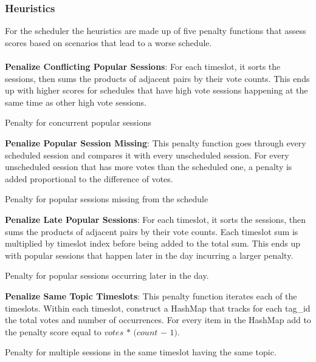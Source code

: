 \subsubsection{Heuristics}
For the scheduler the heuristics are made up of five penalty functions that assess scores based on scenarios that lead to a worse schedule. \\\\
%
%
\textbf{Penalize Conflicting Popular Sessions}: For each timeslot, it sorts the sessions, then sums the products of adjacent pairs by their vote counts. This ends up with higher scores for schedules that have high vote sessions happening at the same time as other high vote sessions.
\begin{pseudocode}{Penalty for concurrent popular sessions}
    
\end{pseudocode}

\textbf{Penalize Popular Session Missing}: This penalty function goes through every scheduled session and compares it with every unscheduled session. For every unscheduled session that has more votes than the scheduled one, a penalty is added proportional to the difference of votes.
\begin{pseudocode}{Penalty for popular sessions missing from the schedule}
    
\end{pseudocode}

\textbf{Penalize Late Popular Sessions}: For each timeslot, it sorts the sessions, then sums the products of adjacent pairs by their vote counts. Each timeslot sum is multiplied by timeslot index before being added to the total sum. This ends up with popular sessions that happen later in the day incurring a larger penalty.
\begin{pseudocode}{Penalty for popular sessions occurring later in the day.}
    
\end{pseudocode}

\textbf{Penalize Same Topic Timeslots}: This penalty function iterates each of the timeslots. Within each timeslot, construct a HashMap that tracks for each tag\_id the total votes and number of occurrences. For every item in the HashMap add to the penalty score equal to $votes$ $*$ $($$count$ $-$ $1$$)$.
\begin{pseudocode}{Penalty for multiple sessions in the same timeslot having the same topic.}
    
\end{pseudocode}

